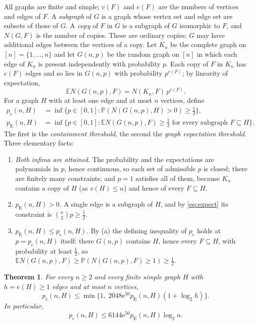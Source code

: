 \documentclass[11pt]{article}
\newtheorem{theorem}{Theorem}[section]
\numberwithin{equation}{section}
\newcommand{\PP}{\mathbb P}
\newcommand{\EE}{\mathbb E}
\newcommand{\pc}{p_{\mathrm c}}
\newcommand{\pE}{p_{\mathrm E}}
\newcommand{\ee}{\mathrm e}
\begin{document}
All graphs are finite and simple; $v(F)$ and $e(F)$ are the numbers of
vertices and edges of $F$. A \emph{subgraph} of $G$ is a graph whose
vertex set and edge set are subsets of those of $G$. A \emph{copy} of $F$
in $G$ is a subgraph of $G$ isomorphic to $F$, and $N(G,F)$ is the number
of copies. These are ordinary copies: $G$ may have additional edges
between the vertices of a copy. Let $K_n$ be the complete graph on
$[n]=\{1,\ldots,n\}$ and let $G(n,p)$ be the random graph on $[n]$ in
which each edge of $K_n$ is present independently with probability $p$.
Each copy of $F$ in $K_n$ has $e(F)$ edges and so lies in $G(n,p)$ with
probability $p^{e(F)}$; by linearity of expectation,
\begin{equation}\label{eq:expect}
 \EE N(G(n,p),F)=N(K_n,F)\,p^{e(F)}.
\end{equation}
For a graph $H$ with at least one edge and at most $n$ vertices, define
\begin{align*}
 \pc(n,H)
 &=\inf\{p\in[0,1]:\PP(N(G(n,p),H)>0)\ge\tfrac12\},\\
 \pE(n,H)
 &=\inf\{p\in[0,1]:\EE N(G(n,p),F)\ge\tfrac12
                 \text{ for every subgraph }F\subseteq H\}.
\end{align*}
The first is the \emph{containment threshold}, the second the
\emph{graph expectation threshold}. Three elementary facts:
\begin{enumerate}[label=(\alph*),leftmargin=2.2em,itemsep=2pt]
 \item \emph{Both infima are attained.} The probability and the
 expectations are polynomials in $p$, hence continuous, so each set of
 admissible $p$ is closed; there are finitely many constraints; and
 $p=1$ satisfies all of them, because $K_n$ contains a copy of $H$ (as
 $v(H)\le n$) and hence of every $F\subseteq H$.
 \item \emph{$\pE(n,H)>0$.} A single edge is a subgraph of $H$, and by
 \eqref{eq:expect} its constraint is $\binom n2p\ge\frac12$.
 \item \emph{$\pE(n,H)\le\pc(n,H)$.} By (a) the defining inequality of
 $\pc$ holds at $p=\pc(n,H)$ itself: there $G(n,p)$ contains $H$, hence
 every $F\subseteq H$, with probability at least $\frac12$, so
 $\EE N(G(n,p),F)\ge\PP(N(G(n,p),F)\ge1)\ge\frac12$.
\end{enumerate}

\begin{theorem}\label{thm:main}
For every $n\ge2$ and every finite simple graph $H$ with $h=e(H)\ge1$
edges and at most $n$ vertices,
\begin{equation}\label{eq:stronger}
 \pc(n,H)\le
 \min\{1,\;2048\ee^{50}\pE(n,H)(1+\log_2 h)\}.
\end{equation}
In particular,
\[
 \pc(n,H)\le6144\ee^{50}\pE(n,H)\log_2 n.
\]
\end{theorem}
\end{document}
